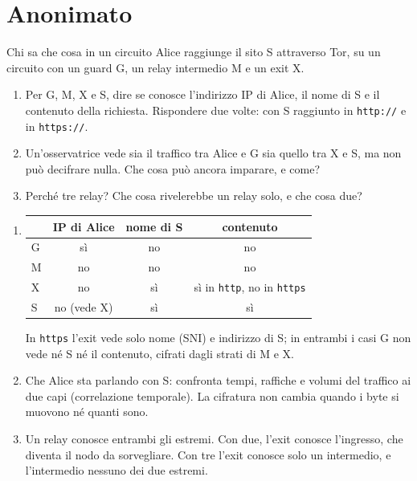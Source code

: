 \section{Anonimato}

\begin{esercizio}{Chi sa che cosa in un circuito}
Alice raggiunge il sito S attraverso Tor, su un circuito con un guard G, un relay intermedio M e un exit X.
\begin{enumerate}[label=(\alph*)]
    \item Per G, M, X e S, dire se conosce l'indirizzo IP di Alice, il nome di S e il contenuto della richiesta. Rispondere due volte: con
          S raggiunto in \texttt{http://} e in \texttt{https://}.
    \item Un'osservatrice vede sia il traffico tra Alice e G sia quello tra X e S, ma non può decifrare nulla. Che cosa può ancora imparare,
          e come?
    \item Perché tre relay? Che cosa rivelerebbe un relay solo, e che cosa due?
\end{enumerate}

\svolgimento
\begin{enumerate}[label=(\alph*)]
    \item \begin{tabular}[t]{lccc}
          \toprule
           & \textbf{IP di Alice} & \textbf{nome di S} & \textbf{contenuto} \\
          \midrule
          G & sì & no & no \\
          M & no & no & no \\
          X & no & sì & sì in \texttt{http}, no in \texttt{https} \\
          S & no (vede X) & sì & sì \\
          \bottomrule
          \end{tabular}

          In \texttt{https} l'exit vede solo nome (SNI) e indirizzo di S; in entrambi i casi G non vede né S né il contenuto, cifrati dagli
          strati di M e X.
    \item Che Alice sta parlando con S: confronta tempi, raffiche e volumi del traffico ai due capi (correlazione temporale). La cifratura non
          cambia quando i byte si muovono né quanti sono.
    \item Un relay conosce entrambi gli estremi. Con due, l'exit conosce l'ingresso, che diventa il nodo da sorvegliare. Con tre l'exit
          conosce solo un intermedio, e l'intermedio nessuno dei due estremi.
\end{enumerate}
\end{esercizio}

